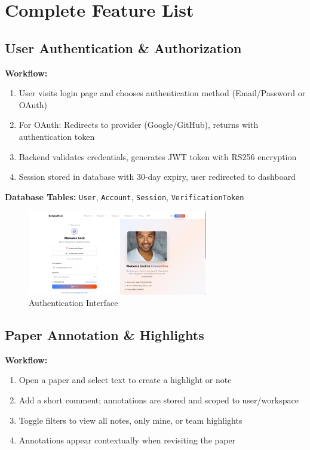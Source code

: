 \chapter{Complete Feature List}
\label{ch:features}

\section{User Authentication \& Authorization}
\label{sec:auth-features}

\textbf{Workflow:}
\begin{enumerate}[leftmargin=*,topsep=3pt,itemsep=2pt]
    \item User visits login page and chooses authentication method (Email/Password or OAuth)
    \item For OAuth: Redirects to provider (Google/GitHub), returns with authentication token
    \item Backend validates credentials, generates JWT token with RS256 encryption
    \item Session stored in database with 30-day expiry, user redirected to dashboard
\end{enumerate}

\textbf{Database Tables:} \texttt{User}, \texttt{Account}, \texttt{Session}, \texttt{VerificationToken}

\begin{figure}[H]
\centering
\includegraphics[width=0.7\textwidth]{images/screenshots/sign_in.png}
\caption{Authentication Interface}
\label{fig:auth}
\end{figure}

\section{Paper Annotation \& Highlights}

    \textbf{Workflow:}
\begin{enumerate}[leftmargin=*,topsep=3pt,itemsep=2pt]
    \item Open a paper and select text to create a highlight or note
    \item Add a short comment; annotations are stored and scoped to user/workspace
    \item Toggle filters to view all notes, only mine, or team highlights
    \item Annotations appear contextually when revisiting the paper
\end{enumerate}

